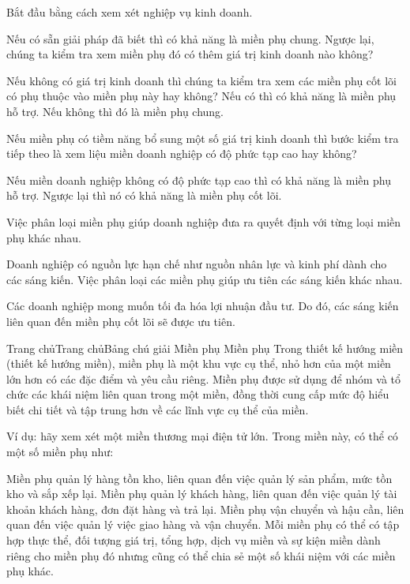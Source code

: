 Bắt đầu bằng cách xem xét nghiệp vụ kinh doanh.

Nếu có sẵn giải pháp đã biết thì có khả năng là miền phụ chung. Ngược lại, chúng ta kiểm tra xem miền phụ đó có thêm giá trị kinh doanh nào không?

Nếu không có giá trị kinh doanh thì chúng ta kiểm tra xem các miền phụ cốt lõi có phụ thuộc vào miền phụ này hay không? Nếu có thì có khả năng là miền phụ hỗ trợ. Nếu không thì đó là miền phụ chung.

Nếu miền phụ có tiềm năng bổ sung một số giá trị kinh doanh thì bước kiểm tra tiếp theo là xem liệu miền doanh nghiệp có độ phức tạp cao hay không?

Nếu miền doanh nghiệp không có độ phức tạp cao thì có khả năng là miền phụ hỗ trợ. Ngược lại thì nó có khả năng là miền phụ cốt lõi.


Việc phân loại miền phụ giúp doanh nghiệp đưa ra quyết định với từng loại miền phụ khác nhau.

Doanh nghiệp có nguồn lực hạn chế như nguồn nhân lực và kinh phí dành cho các sáng kiến. Việc phân loại các miền phụ giúp ưu tiên các sáng kiến khác nhau.

Các doanh nghiệp mong muốn tối đa hóa lợi nhuận đầu tư. Do đó, các sáng kiến liên quan đến miền phụ cốt lõi sẽ được ưu tiên.

%


Trang chủTrang chủBảng chú giải Miền phụ
Miền phụ
Trong thiết kế hướng miền (thiết kế hướng miền), miền phụ là một khu vực cụ thể, nhỏ hơn của một miền lớn hơn có các đặc điểm và yêu cầu riêng. Miền phụ được sử dụng để nhóm và tổ chức các khái niệm liên quan trong một miền, đồng thời cung cấp mức độ hiểu biết chi tiết và tập trung hơn về các lĩnh vực cụ thể của miền.

Ví dụ: hãy xem xét một miền thương mại điện tử lớn. Trong miền này, có thể có một số miền phụ như:

Miền phụ quản lý hàng tồn kho, liên quan đến việc quản lý sản phẩm, mức tồn kho và sắp xếp lại.
Miền phụ quản lý khách hàng, liên quan đến việc quản lý tài khoản khách hàng, đơn đặt hàng và trả lại.
Miền phụ vận chuyển và hậu cần, liên quan đến việc quản lý việc giao hàng và vận chuyển.
Mỗi miền phụ có thể có tập hợp thực thể, đối tượng giá trị, tổng hợp, dịch vụ miền và sự kiện miền dành riêng cho miền phụ đó nhưng cũng có thể chia sẻ một số khái niệm với các miền phụ khác.

